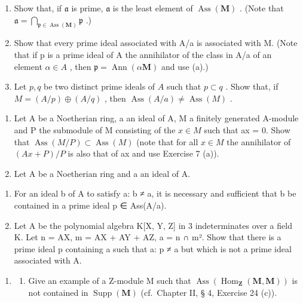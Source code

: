 \begin{enumerate}
\def\labelenumi{(\alph{enumi})}
\item
  Show that, if \(\mathfrak{a}\) is prime, \(\mathfrak{a}\) is the least element of \(\operatorname{Ass}(\mathbf{M})\) . (Note that \(\mathfrak{a} = \bigcap_{\mathfrak{p} \in \operatorname{Ass}(\mathbf{M})} \mathfrak{p}\) .)
\item
  Show that every prime ideal associated with A/a is associated with M. (Note that if p is a prime ideal of A the annihilator of the class in A/a of an element \(\alpha \in A\) , then \(\mathfrak{p} = \operatorname{Ann}(\alpha\mathbf{M})\) and use (a).)
\item
  Let \(p, q\) be two distinct prime ideals of \(A\) such that \(p \subset q\) . Show that, if \(M = (A/p) \oplus (A/q)\) , then \(\operatorname{Ass}(A/a) \neq \operatorname{Ass}(M)\) .
\end{enumerate}

\begin{enumerate}
\def\labelenumi{\arabic{enumi}.}
\setcounter{enumi}{7}
\item
  Let A be a Noetherian ring, a an ideal of A, M a finitely generated A-module and P the submodule of M consisting of the \(x \in M\) such that ax = 0. Show that \(\operatorname{Ass}(M/P) \subset \operatorname{Ass}(M)\) (note that for all \(x \in M\) the annihilator of \((Ax + P)/P\) is also that of ax and use Exercise 7 (a)).
\item
  Let A be a Noetherian ring and a an ideal of A.
\end{enumerate}

\begin{enumerate}
\def\labelenumi{(\alph{enumi})}
\item
  For an ideal b of A to satisfy a: b ≠ a, it is necessary and sufficient that b be contained in a prime ideal p ∈ Ass(A/a).
\item
  Let A be the polynomial algebra K{[}X, Y, Z{]} in 3 indeterminates over a field K. Let n = AX, m = AX + AY + AZ, a = n ∩ m². Show that there is a prime ideal p containing a such that a: p ≠ a but which is not a prime ideal associated with A.
\end{enumerate}

\begin{enumerate}
\def\labelenumi{\arabic{enumi}.}
\setcounter{enumi}{9}
\tightlist
\item
  \begin{enumerate}
  \def\labelenumii{(\alph{enumii})}
  \tightlist
  \item
    Give an example of a Z-module M such that \(\operatorname{Ass}(\operatorname{Hom}_{\mathbf{Z}}(\mathbf{M}, \mathbf{M}))\) is not contained in \(\operatorname{Supp}(\mathbf{M})\) (cf.~Chapter II, § 4, Exercise 24 (c)).
  \end{enumerate}
\end{enumerate}

